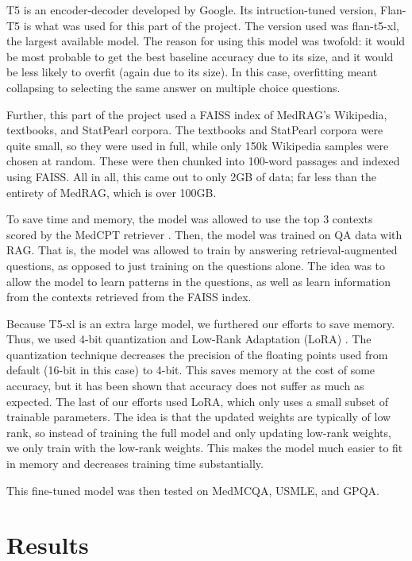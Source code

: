 \documentclass{article}
\begin{document}
T5 is an encoder-decoder developed by Google. Its intruction-tuned version, Flan-T5 \cite{chung2022scalinginstructionfinetunedlanguagemodels} is what was used for this part of the project. The version used was flan-t5-xl, the largest available model. The reason for using this model was twofold: it would be most probable to get the best baseline accuracy due to its size, and it would be less likely to overfit (again due to its size). In this case, overfitting meant collapsing to selecting the same answer on multiple choice questions.

Further, this part of the project used a FAISS \cite{douze2025faisslibrary} index of MedRAG's Wikipedia, textbooks, and StatPearl corpora. The textbooks and StatPearl corpora were quite small, so they were used in full, while only 150k Wikipedia samples were chosen at random. These were then chunked into 100-word passages and indexed using FAISS. All in all, this came out to only 2GB of data; far less than the entirety of MedRAG, which is over 100GB.

To save time and memory, the model was allowed to use the top 3 contexts scored by the MedCPT retriever \cite{Jin_2023}. Then, the model was trained on QA data with RAG. That is, the model was allowed to train by answering retrieval-augmented questions, as opposed to just training on the questions alone. The idea was to allow the model to learn patterns in the questions, as well as learn information from the contexts retrieved from the FAISS index.

Because T5-xl is an extra large model, we furthered our efforts to save memory. Thus, we used 4-bit quantization \cite{dettmers2023qloraefficientfinetuningquantized} and Low-Rank Adaptation (LoRA) \cite{hu2021loralowrankadaptationlarge}. The quantization technique decreases the precision of the floating points used from default (16-bit in this case) to 4-bit. This saves memory at the cost of some accuracy, but it has been shown that accuracy does not suffer as much as expected. The last of our efforts used LoRA, which only uses a small subset of trainable parameters. The idea is that the updated weights are typically of low rank, so instead of training the full model and only updating low-rank weights, we only train with the low-rank weights. This makes the model much easier to fit in memory and decreases training time substantially.

This fine-tuned model was then tested on MedMCQA, USMLE, and GPQA.

\section{Results}
\end{document}
